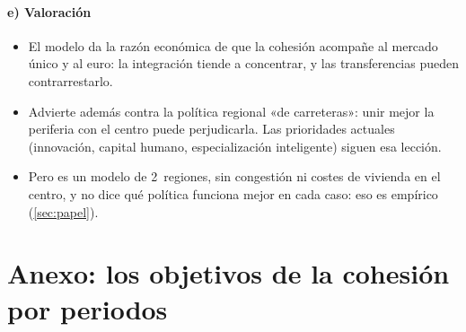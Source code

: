 \documentclass[11pt]{article}
\begin{document}
\paragraph{e) Valoración}

\begin{itemize}
\item El modelo da la razón económica de que la cohesión acompañe al mercado único y al euro: la integración tiende a concentrar, y las transferencias pueden contrarrestarlo.
\item Advierte además contra la política regional «de carreteras»: unir mejor la periferia con el centro puede perjudicarla. Las prioridades actuales (innovación, capital humano, especialización inteligente) siguen esa lección.
\item Pero es un modelo de 2~regiones, sin congestión ni costes de vivienda en el centro, y no dice qué política funciona mejor en cada caso: eso es empírico (\ref{sec:papel}).
\end{itemize}

\section{Anexo: los objetivos de la cohesión por periodos}\label{anexo:objetivos}
\end{document}
